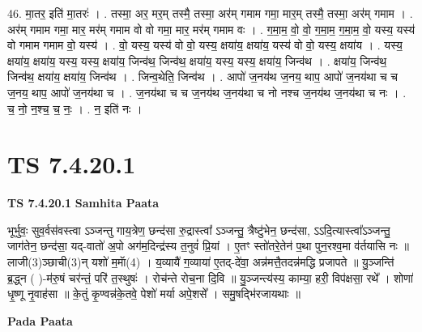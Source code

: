 \documentclass[17pt]{extarticle}
\begin{document}
46. मा॒तर॒ इति॑ मा॒तरः॑ । . तस्मा॒ अर॒ मर॒म् तस्मै॒ तस्मा॒ अर॑म् गमाम गमा॒ मार॒म् तस्मै॒ तस्मा॒ अर॑म् गमाम । . अर॑म् गमाम गमा॒ मार॒ मर॑म् गमाम वो वो गमा॒ मार॒ मर॑म् गमाम वः । . ग॒मा॒म॒ वो॒ वो॒ ग॒मा॒म॒ ग॒मा॒म॒ वो॒ यस्य॒ यस्य॑ वो गमाम गमाम वो॒ यस्य॑ । . वो॒ यस्य॒ यस्य॑ वो वो॒ यस्य॒ क्षया॑य॒ क्षया॑य॒ यस्य॑ वो वो॒ यस्य॒ क्षया॑य । . यस्य॒ क्षया॑य॒ क्षया॑य॒ यस्य॒ यस्य॒ क्षया॑य॒ जिन्व॑थ॒ जिन्व॑थ॒ क्षया॑य॒ यस्य॒ यस्य॒ क्षया॑य॒ जिन्व॑थ । . क्षया॑य॒ जिन्व॑थ॒ जिन्व॑थ॒ क्षया॑य॒ क्षया॑य॒ जिन्व॑थ । . जिन्व॒थेति॒ जिन्व॑थ । . आपो॑ ज॒नय॑थ ज॒नय॒ थाप॒ आपो॑ ज॒नय॑था च च ज॒नय॒ थाप॒ आपो॑ ज॒नय॑था च । . ज॒नय॑था च च ज॒नय॑थ ज॒नय॑था च नो नश्च ज॒नय॑थ ज॒नय॑था च नः । . च॒ नो॒ न॒श्च॒ च॒ नः॒ । . न॒ इति॑ नः । \newline
\pagebreak
{}

\section{ TS 7.4.20.1 }

\textbf{TS 7.4.20.1 } \newline
\textbf{Samhita Paata} \newline

भूर्भुवः॒ सुव॒र्वस॑वस्त्वा ऽञ्जन्तु गाय॒त्रेण॒ छन्द॑सा रु॒द्रास्त्वा᳚ ऽञ्जन्तु॒ त्रैष्टु॑भेन॒ छन्द॑सा, ऽऽदि॒त्यास्त्वा᳚ऽञ्जन्तु॒ जाग॑तेन॒ छन्द॑सा॒ यद्-वातो॑ अ॒पो अग॑म॒दिन्द्र॑स्य त॒नुवं॑ प्रि॒यां । ए॒तꣳ स्तो॑तरे॒तेन॑ प॒था पुन॒रश्व॒मा व॑र्तयासि नः ॥ लाजी(3)ञ्छाची(3)न् यशो॑ म॒माॅ(4) । य॒व्यायै॑ ग॒व्याया॑ ए॒तद्-दे॑वा॒ अन्न॑मत्तै॒तदन्न॑मद्धि प्रजापते ॥ यु॒ञ्जन्ति॑ ब्र॒द्ध्न ( )-म॑रु॒षं चर॑न्तं॒ परि॑ त॒स्थुषः॑ । रोच॑न्ते रोच॒ना दि॒वि ॥ यु॒ञ्जन्त्य॑स्य॒ काम्या॒ हरी॒ विप॑क्षसा॒ रथे᳚ । शोणा॑ धृ॒ष्णू नृ॒वाह॑सा ॥ के॒तुं कृ॒ण्वन्न॑के॒तवे॒ पेशो॑ मर्या अपे॒शसे᳚ । समु॒षद्भि॑रजायथाः ॥ \newline

\textbf{Pada Paata} \newline
\end{document}
